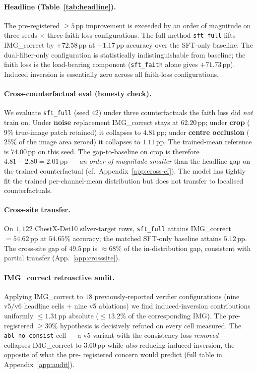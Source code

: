 \documentclass{article}
\begin{document}
\paragraph{Headline (Table~\ref{tab:headline}).} The pre-registered
$\geq 5$\,pp improvement is exceeded by an order of magnitude on three
seeds $\times$ three faith-loss configurations. The full method
\texttt{sft\_full} lifts IMG\_correct by $+72.58$\,pp at $+1.17$\,pp
accuracy over the SFT-only baseline. The dual-filter-only configuration
is statistically indistinguishable from baseline; the faith loss is the
load-bearing component (\texttt{sft\_faith} alone gives $+71.73$\,pp).
Induced inversion is essentially zero across all faith-loss
configurations.

\paragraph{Cross-counterfactual eval (honesty check).} We evaluate
\texttt{sft\_full} (seed $42$) under three counterfactuals the faith
loss did \emph{not} train on. Under \textbf{noise} replacement
IMG\_correct stays at $62.20$\,pp; under \textbf{crop} ($9\%$ true-image
patch retained) it collapses to $4.81$\,pp; under \textbf{centre
occlusion} ($25\%$ of the image area zeroed) it collapses to
$1.11$\,pp. The trained-mean reference is $74.00$\,pp on this seed. The
gap-to-baseline on crop is therefore $4.81 - 2.80 = 2.01$\,pp ---
\emph{an order of magnitude smaller} than the headline gap on the
trained counterfactual (cf.\ Appendix~\ref{app:cross-cf}). The model
has tightly fit the trained per-channel-mean distribution but does not
transfer to localised counterfactuals.

\paragraph{Cross-site transfer.} On $1{,}122$ ChestX-Det10 silver-target
rows, \texttt{sft\_full} attains IMG\_correct $= 54.62$\,pp at
$54.65\%$ accuracy; the matched SFT-only baseline attains $5.12$\,pp.
The cross-site gap of $49.5$\,pp is $\approx 68\%$ of the in-distribution
gap, consistent with partial transfer (App.~\ref{app:crosssite}).

\paragraph{IMG\_correct retroactive audit.}
\label{sec:audit}
Applying IMG\_correct to $18$ previously-reported verifier
configurations (nine v5/v6 headline cells + nine v5 ablations) we find
induced-inversion contributions uniformly $\leq 1.31$\,pp absolute
($\leq 13.2\%$ of the corresponding IMG). The pre-registered
$\geq 30\%$ hypothesis is decisively refuted on every cell measured.
The \texttt{abl\_no\_consist} cell --- a v5 variant with the consistency
loss \emph{removed} --- collapses IMG\_correct to $3.60$\,pp while
\emph{also} reducing induced inversion, the opposite of what the pre-
registered concern would predict (full table in
Appendix~\ref{app:audit}).
\end{document}
